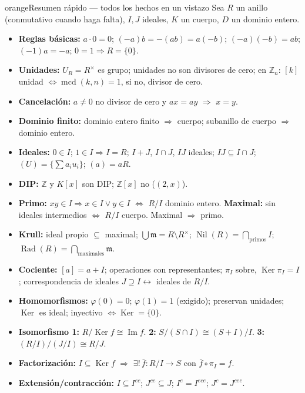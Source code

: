 \documentclass[11pt,twoside]{article}
\DeclareMathOperator{\Ker}{Ker}
\DeclareMathOperator{\Imm}{Im}
\DeclareMathOperator{\Nil}{Nil}
\DeclareMathOperator{\Rad}{Rad}
\DeclareMathOperator{\mcd}{mcd}
\newcommand{\Z}{\mathbb{Z}}
\begin{document}
\begin{equivbox}{orange}{Resumen rápido --- todos los hechos en un vistazo}
Sea $R$ un anillo (conmutativo cuando haga falta), $I, J$ ideales, $K$ un cuerpo, $D$ un dominio entero.
\begin{itemize}[leftmargin=2em]
\item \textbf{Reglas básicas:} $a \cdot 0 = 0$; $(-a)b = -(ab) = a(-b)$; $(-a)(-b) = ab$; $(-1)a = -a$; $0 = 1 \Rightarrow R = \{0\}$.
\item \textbf{Unidades:} $U_{R} = R^{\times}$ es grupo; unidades no son divisores de cero; en $\Z_{n}$: $[k]$ unidad $\iff \mcd(k,n) = 1$, si no, divisor de cero.
\item \textbf{Cancelación:} $a \neq 0$ no divisor de cero y $ax = ay$ $\Rightarrow$ $x = y$.
\item \textbf{Dominio finito:} dominio entero finito $\Rightarrow$ cuerpo; subanillo de cuerpo $\Rightarrow$ dominio entero.
\item \textbf{Ideales:} $0 \in I$; $1 \in I \Rightarrow I = R$; $I + J$, $I \cap J$, $IJ$ ideales; $IJ \subseteq I \cap J$; $(U) = \{\sum a_{i} u_{i}\}$; $(a) = aR$.
\item \textbf{DIP:} $\Z$ y $K[x]$ son DIP; $\Z[x]$ no ($(2,x)$).
\item \textbf{Primo:} $xy \in I \Rightarrow x \in I \lor y \in I$ $\iff$ $R/I$ dominio entero. \textbf{Maximal:} sin ideales intermedios $\iff$ $R/I$ cuerpo. Maximal $\Rightarrow$ primo.
\item \textbf{Krull:} ideal propio $\subseteq$ maximal; $\bigcup \mathfrak{m} = R \setminus R^{\times}$; $\Nil(R) = \bigcap_{\text{primos}} I$; $\Rad(R) = \bigcap_{\text{maximales}} \mathfrak{m}$.
\item \textbf{Cociente:} $[a] = a + I$; operaciones con representantes; $\pi_{I}$ sobre, $\Ker \pi_{I} = I$; correspondencia de ideales $J \supseteq I \leftrightarrow$ ideales de $R/I$.
\item \textbf{Homomorfismos:} $\varphi(0) = 0$; $\varphi(1) = 1$ (exigido); preservan unidades; $\Ker$ es ideal; inyectivo $\iff \Ker = \{0\}$.
\item \textbf{Isomorfismo 1:} $R/\Ker f \cong \Imm f$. \textbf{2:} $S/(S \cap I) \cong (S+I)/I$. \textbf{3:} $(R/I)/(J/I) \cong R/J$.
\item \textbf{Factorización:} $I \subseteq \Ker f$ $\Rightarrow$ $\exists!\, \bar{f} : R/I \to S$ con $\bar{f} \circ \pi_{I} = f$.
\item \textbf{Extensión/contracción:} $I \subseteq I^{ec}$; $J^{ce} \subseteq J$; $I^{e} = I^{ece}$; $J^{c} = J^{cec}$.

\end{itemize}
\end{equivbox}
\end{document}
